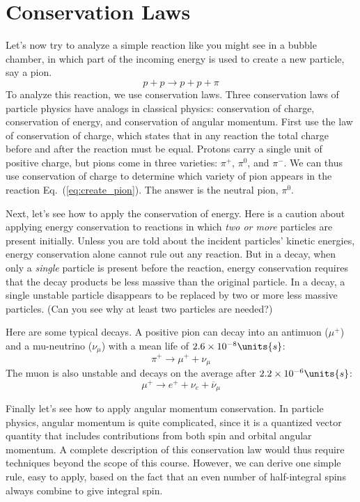 \section{Conservation Laws}
\label{sec:conservation_laws}

Let's now try to analyze a simple reaction like you might see in a
bubble chamber, in which part of the incoming energy is used to create
a new particle, say a pion.
\begin{equation}
p + p \to p + p + \pi
\label{eq:create_pion}
\end{equation}
To analyze this reaction, we use conservation laws.  Three
conservation laws of particle physics have analogs in classical
physics: conservation of charge, conservation of energy, and
conservation of angular momentum.  First use the law of
conservation of charge, which states that in any reaction the
total charge before and after the reaction must be equal.  Protons
carry a single unit of positive charge, but pions come in three
varieties: $\pi^+$, $\pi^0$, and $\pi^-$.  We can thus use
conservation of charge to determine which variety of pion appears
in the reaction Eq.~(\ref{eq:create_pion}).  The answer is the
neutral pion, $\pi^0$.

Next, let's see how to apply the conservation of energy.  Here is a
caution about applying energy conservation to reactions in which {\em
two or more} particles are present initially.  Unless you are told
about the incident particles' kinetic energies, energy conservation
alone cannot rule out any reaction.  But in a decay, when only a {\em
single} particle is present before the reaction, energy conservation
requires that the decay products be less massive than the original
particle.  In a decay, a single unstable particle disappears to be
replaced by two or more less massive particles.  (Can you see why at
least two particles are needed?)

Here are some typical decays.  A positive pion can decay into an
antimuon ($\mu^+$) and a mu-neutrino ($\nu_\mu$) with a mean life of
$2.6 \times 10^{-8}\units{s}$:
\begin{equation}
\pi^+ \to \mu^+ + \nu_\mu
\label{eq:pion_decay}
\end{equation}
The muon is also unstable and decays on the average after $2.2 \times
10^{-6}\units{s}$:
\begin{equation}
\mu^+ \to e^+ + \nu_e + \overline\nu_\mu
\label{eq:muon_decay}
\end{equation}

Finally let's see how to apply angular momentum conservation.  In
particle physics, angular momentum is quite complicated, since it is a
quantized vector quantity that includes contributions from both spin
and orbital angular momentum.  A complete description of this
conservation law would thus require techniques beyond the scope of
this course.  However, we can derive one simple rule, easy to apply,
based on the fact that an even number of half-integral spins always
combine to give integral spin.

